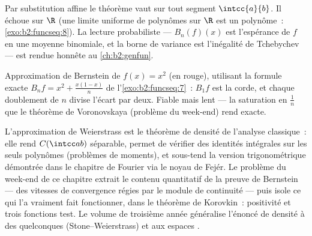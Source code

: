 \begin{remark}
Par substitution affine le théorème vaut sur tout segment
$\intcc{a}{b}$. Il échoue sur $\R$ (une limite uniforme de polynômes
sur $\R$ est un polynôme~: \cref{exo:b2:funcseq:8}). La lecture
probabiliste --- $B_n(f)(x)$ est l'espérance de $f$ en une moyenne
binomiale, et la borne de variance est l'inégalité de Tchebychev ---
est rendue honnête au \cref{ch:b2:genfun}.
\end{remark}

\begin{omfigure}

{\small Approximation de Bernstein de $f(x) = x^2$ (en rouge),
utilisant la formule exacte $B_nf = x^2 + \frac{x(1-x)}{n}$ de
l'\cref{exo:b2:funcseq:7}~: $B_1f$ est la corde, et chaque doublement
de $n$ divise l'écart par deux. Fiable mais lent --- la saturation en
$\frac1n$ que le théorème de Voronovskaya (problème du week-end) rend
exacte.}
\end{omfigure}

\begin{remark}
L'approximation de Weierstrass est le théorème de densité de l'analyse
classique~: elle rend $C(\intcc ab)$ séparable, permet de vérifier des
identités intégrales sur les seuls polynômes (problèmes de moments),
et sous-tend la version trigonométrique démontrée dans le chapitre de
Fourier via le noyau de Fejér. Le problème du week-end de ce chapitre
extrait le contenu quantitatif de la preuve de Bernstein --- des
vitesses de convergence régies par le module de continuité --- puis
isole ce qui l'a vraiment fait fonctionner, dans le théorème de
Korovkin~: positivité et trois fonctions test. Le volume de troisième
année généralise l'énoncé de densité à des  quelconques
(Stone--Weierstrass) et aux espaces .
\end{remark}

